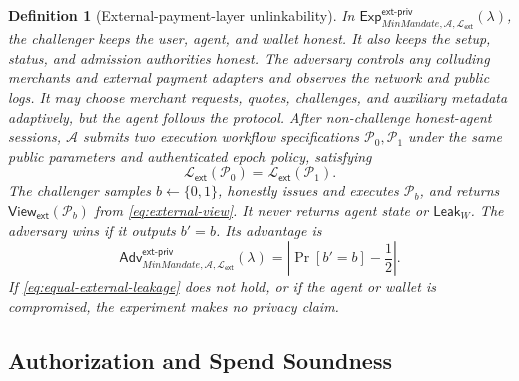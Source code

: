 \documentclass[letterpaper]{article}
\newcommand{\system}{MinMandate\xspace}
\newcommand{\trace}{\mathcal{P}}
\newcommand{\adv}{\mathcal{A}}
\newtheorem{definition}{Definition}
\begin{document}
\begingroup\sloppy
\begin{definition}[External-payment-layer unlinkability]
\label{def:wf-privacy}
In \(\mathsf{Exp}^{\mathsf{ext\text{-}priv}}_{\system,\adv,
\mathcal L_{\mathsf{ext}}}(\lambda)\), the challenger keeps the user, agent,
and wallet honest. It also keeps the setup, status, and admission authorities
honest. The adversary
controls any colluding merchants and external payment adapters and observes the
network and public logs. It may choose merchant requests, quotes, challenges,
and auxiliary metadata adaptively, but the agent follows the protocol. After
non-challenge honest-agent sessions, \(\adv\) submits two execution workflow
specifications \(\trace_0,\trace_1\) under the same public parameters and
authenticated epoch policy, satisfying
\begin{equation}
  \mathcal L_{\mathsf{ext}}(\trace_0)
  =\mathcal L_{\mathsf{ext}}(\trace_1).
\label{eq:equal-external-leakage}
\end{equation}
The challenger samples \(b\leftarrow\{0,1\}\), honestly issues and executes
\(\trace_b\), and returns \(\mathsf{View}_{\mathsf{ext}}(\trace_b)\) from
\cref{eq:external-view}. It never returns agent state or
\(\mathsf{Leak}_W\). The adversary wins if it outputs \(b'=b\). Its advantage is
\begin{equation}
  \mathsf{Adv}^{\mathsf{ext\text{-}priv}}_{\system,\adv,
  \mathcal L_{\mathsf{ext}}}(\lambda)
  =
  \left|\Pr[b'=b]-\frac12\right|.
\label{eq:workflow-privacy-adv}
\end{equation}
If \cref{eq:equal-external-leakage} does not hold, or if the agent or wallet is
compromised, the experiment makes no privacy claim.
\end{definition}
\endgroup

\subsection{Authorization and Spend Soundness}
\end{document}
